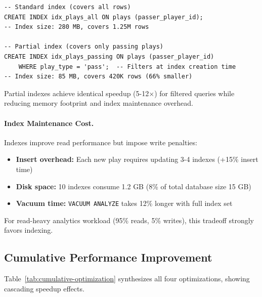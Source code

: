 \begin{verbatim}
-- Standard index (covers all rows)
CREATE INDEX idx_plays_all ON plays (passer_player_id);
-- Index size: 280 MB, covers 1.25M rows

-- Partial index (covers only passing plays)
CREATE INDEX idx_plays_passing ON plays (passer_player_id)
    WHERE play_type = 'pass';  -- Filters at index creation time
-- Index size: 85 MB, covers 420K rows (66% smaller)
\end{verbatim}

Partial indexes achieve identical speedup (5-12$\times$) for filtered queries while reducing memory footprint and index maintenance overhead.

\paragraph{Index Maintenance Cost.}
Indexes improve read performance but impose write penalties:

\begin{itemize}[itemsep=2pt,parsep=0pt]
    \item \textbf{Insert overhead:} Each new play requires updating 3-4 indexes (+15\% insert time)
    \item \textbf{Disk space:} 10 indexes consume 1.2 GB (8\% of total database size 15 GB)
    \item \textbf{Vacuum time:} \texttt{VACUUM ANALYZE} takes 12\% longer with full index set
\end{itemize}

For read-heavy analytics workload (95\% reads, 5\% writes), this tradeoff strongly favors indexing.

\subsection{Cumulative Performance Improvement}

Table~\ref{tab:cumulative-optimization} synthesizes all four optimizations, showing cascading speedup effects.

